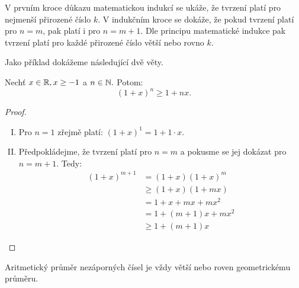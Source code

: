 V prvním kroce důkazu matematickou indukcí se ukáže, že tvrzení platí
pro nejmenší přirozené číslo $k$. V indukčním kroce se dokáže, že pokud
tvrzení platí pro $n = m$, pak platí i pro $n = m+1$. Dle principu matematické
indukce pak tvrzení platí pro každé přirozené číslo větší nebo rovno $k$.

Jako příklad dokážeme následující dvě věty.

\begin{theorem}
    \label{th:bernoulli}
    Nechť $x \in \mathbb{R}, x \geq -1$ a $n \in \mathbb{N}.$ Potom:
    $$(1 + x)^n \geq 1 + nx.$$
\end{theorem}

\begin{proof}
    \leavevmode
    \begin{enumerate}[I.]
        \item Pro $n = 1$ zřejmě platí: $(1 + x)^1  = 1 + 1\cdot x.$
        \item Předpokládejme, že tvrzení platí pro $n = m$ a pokusme se jej
            dokázat pro $n = m+1.$ Tedy:
            \begin{align*}
                (1 + x)^{m+1} &= (1+x)(1+x)^m \\
                              &\geq (1+x)(1+mx) \tag{dle indukčního předpokladu} \\
                              &= 1 + x + mx + mx^2 \\
                              &= 1 + (m+1)x + mx^2 \\
                              &\geq 1 + (m+1)x \tag{jelikož $mx^2 \geq 0$}
            \end{align*}
    \end{enumerate}
\end{proof}

\begin{theorem}
    \label{th:agprumer}
    Aritmetický průměr nezáporných čísel je vždy větší nebo roven geometrickému 
    průměru. 
\end{theorem}

